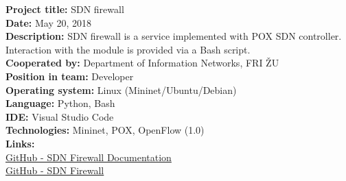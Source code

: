\documentclass[slovak]{article}
\begin{document}
\noindent
\textbf{Project title:} SDN firewall\\
\textbf{Date:} May 20, 2018\\
\textbf{Description:} SDN firewall is a service implemented with POX SDN controller. Interaction with the module is provided via a Bash script.\\
\textbf{Cooperated by:} Department of Information Networks, FRI ŽU\\
\textbf{Position in team:} Developer\\
\textbf{Operating system:} Linux (Mininet/Ubuntu/Debian)\\
\textbf{Language:} Python, Bash\\
\textbf{IDE:} Visual Studio Code\\
\textbf{Technologies:} Mininet, POX, OpenFlow (1.0)\\
\textbf{Links:}\\
\href{https://github.com/kyberdrb/FRI/tree/master/Ing/4.semester/Integracia\_Sieti/semestralka}{GitHub - SDN Firewall Documentation}\\
\href{https://github.com/kyberdrb/sdnfirewall}{GitHub - SDN Firewall}
\end{document}
